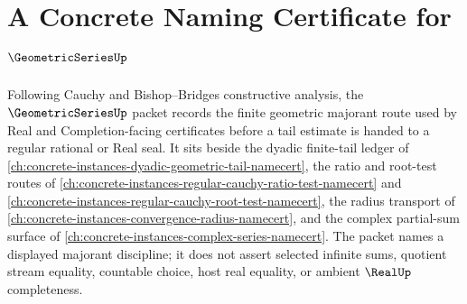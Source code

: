 \chapter{A Concrete Naming Certificate for $\GeometricSeriesUp$}
\label{ch:concrete-instances-geometric-series-namecert}

Following Cauchy and Bishop--Bridges constructive analysis, the $\GeometricSeriesUp$ packet records the finite geometric majorant route used by Real and Completion-facing certificates before a tail estimate is handed to a regular rational or Real seal. It sits beside the dyadic finite-tail ledger of \autoref{ch:concrete-instances-dyadic-geometric-tail-namecert}, the ratio and root-test routes of \autoref{ch:concrete-instances-regular-cauchy-ratio-test-namecert} and \autoref{ch:concrete-instances-regular-cauchy-root-test-namecert}, the radius transport of \autoref{ch:concrete-instances-convergence-radius-namecert}, and the complex partial-sum surface of \autoref{ch:concrete-instances-complex-series-namecert}. The packet names a displayed majorant discipline; it does not assert selected infinite sums, quotient stream equality, countable choice, host real equality, or ambient $\RealUp$ completeness.

